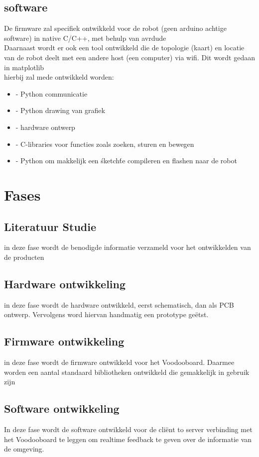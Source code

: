 \documentclass{article}
\begin{document}
\subsection{software}
De firmware zal specifiek ontwikkeld voor de robot (geen arduino achtige software) in native C/C++, met behulp van avrdude\\
Daarnaast wordt er ook een tool ontwikkeld die de topologie (kaart) en locatie van de robot deelt met een andere host (een computer) via wifi. Dit wordt gedaan in matplotlib\\
hierbij zal mede ontwikkeld worden:
\begin{itemize}
 \item- Python communicatie
 \item- Python drawing van grafiek
 \item- hardware ontwerp
 \item- C-libraries voor functies zoals zoeken, sturen en bewegen
 \item- Python om makkelijk een \'sketch\' te compileren en flashen naar de robot
\end{itemize}
\section{Fases}
\subsection{Literatuur Studie}			
in deze fase wordt de benodigde informatie verzameld voor het ontwikkelden van de producten
\subsection{Hardware ontwikkeling}
in deze fase wordt de hardware ontwikkeld, eerst schematisch, dan als PCB ontwerp. Vervolgens word hiervan handmatig een prototype geëtst.
\subsection{Firmware ontwikkeling}
in deze fase wordt de firmware ontwikkeld voor het Voodooboard. Daarmee worden een aantal standaard bibliotheken ontwikkeld die gemakkelijk in gebruik zijn
\subsection{Software ontwikkeling}
In deze fase wordt de software ontwikkeld voor de cliënt to server verbinding met het Voodooboard te leggen om realtime feedback te geven over de informatie van de omgeving.
\end{document}
